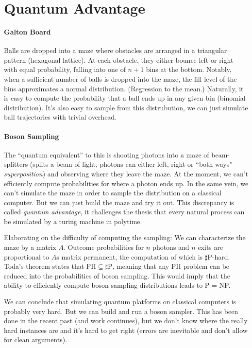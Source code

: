 \documentclass{article}
\begin{document}
\section*{Quantum Advantage}

\paragraph{Galton Board} Balls are dropped into a maze where obstacles are arranged in a triangular pattern (hexagonal lattice). At each obstacle, they either bounce left or right with equal probability, falling into one of $n + 1$ bins at the bottom. Notably, when a sufficient number of balls is dropped into the maze, the fill level of the bins approximates a normal distribution. (Regression to the mean.) Naturally, it is easy to compute the probability that a ball ends up in any given bin (binomial distribution). It's also easy to sample from this distrubution, we can just simulate ball trajectories with trivial overhead.

\paragraph{Boson Sampling} The \enquote{quantum equivalent} to this is shooting photons into a maze of beam-splitters (splits a beam of light, photons can either left, right or \enquote{both ways} --- \emph{superposition}) and observing where they leave the maze. At the moment, we can't efficiently compute probabilities for where a photon ends up. In the same vein, we can't simulate the maze in order to sample the distribution on a classical computer. But we can just build the maze and try it out. This discrepancy is called \emph{quantum advantage}, it challenges the thesis that every natural process can be simulated by a turing machine in polytime.

Elaborating on the difficulty of computing the sampling: We can characterize the maze by a matrix $A$. Outcome probabilities for $n$ photons and $n$ exits are proportional to $A$s matrix permanent, the computation of which is $\sharp \text{P}$-hard. Toda's theorem states that $\text{PH} \subseteq \sharp \text{P}$, meaning that any PH problem can be reduced into the probabilities of boson sampling. This would imply that the ability to efficiently compute boson sampling distributions leads to P = NP.

We can conclude that simulating quantum platforms on classical computers is probably very hard. But we can build and run a boson sampler. This has been done in the recent past (and work continues), but we don't know where the really hard instances are and it's hard to get right (errors are inevitable and don't allow for clean arguments).
\end{document}
